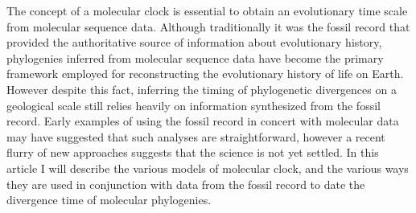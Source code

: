 The concept of a molecular clock is essential to obtain an evolutionary time scale from molecular sequence data.
Although traditionally it was the fossil record that provided the authoritative source of information about evolutionary history, phylogenies inferred from molecular sequence data have become the primary framework employed for reconstructing the evolutionary history of life on Earth. However despite this fact, inferring the timing of phylogenetic divergences on a geological scale still relies heavily on information synthesized from the fossil record. Early examples of using the fossil record in concert with molecular data may have suggested that such analyses are straightforward, however a recent flurry of new approaches suggests that the science is not yet settled. In this article I will describe the various models of molecular clock, and the various ways they are used in conjunction with data from the fossil record to date the divergence time of molecular phylogenies.
  